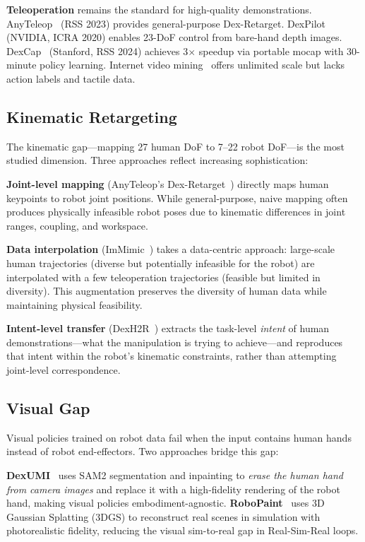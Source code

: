 \textbf{Teleoperation} remains the standard for high-quality demonstrations. AnyTeleop~\cite{qin2023anyteleop} (RSS 2023) provides general-purpose Dex-Retarget. DexPilot~\cite{handa2020dexpilot} (NVIDIA, ICRA 2020) enables 23-DoF control from bare-hand depth images. DexCap~\cite{wang2024dexcap} (Stanford, RSS 2024) achieves 3$\times$ speedup via portable mocap with 30-minute policy learning. Internet video mining~\cite{liu2025immimic} offers unlimited scale but lacks action labels and tactile data.

\subsection{Kinematic Retargeting}

The kinematic gap---mapping 27 human DoF to 7--22 robot DoF---is the most studied dimension. Three approaches reflect increasing sophistication:

\textbf{Joint-level mapping} (AnyTeleop's Dex-Retarget~\cite{qin2023anyteleop}) directly maps human keypoints to robot joint positions. While general-purpose, naive mapping often produces physically infeasible robot poses due to kinematic differences in joint ranges, coupling, and workspace.

\textbf{Data interpolation} (ImMimic~\cite{liu2025immimic}) takes a data-centric approach: large-scale human trajectories (diverse but potentially infeasible for the robot) are interpolated with a few teleoperation trajectories (feasible but limited in diversity). This augmentation preserves the diversity of human data while maintaining physical feasibility.

\textbf{Intent-level transfer} (DexH2R~\cite{li2024dexh2r}) extracts the task-level \emph{intent} of human demonstrations---what the manipulation is trying to achieve---and reproduces that intent within the robot's kinematic constraints, rather than attempting joint-level correspondence.

\subsection{Visual Gap}

Visual policies trained on robot data fail when the input contains human hands instead of robot end-effectors. Two approaches bridge this gap:

\textbf{DexUMI}~\cite{xu2025dexumi} uses SAM2 segmentation and inpainting to \emph{erase the human hand from camera images} and replace it with a high-fidelity rendering of the robot hand, making visual policies embodiment-agnostic. \textbf{RoboPaint}~\cite{various2026robopaint} uses 3D Gaussian Splatting (3DGS) to reconstruct real scenes in simulation with photorealistic fidelity, reducing the visual sim-to-real gap in Real-Sim-Real loops.

